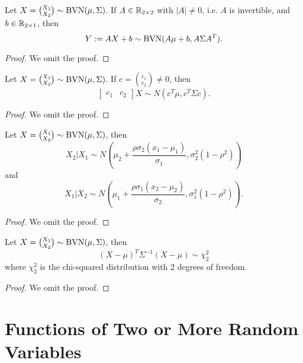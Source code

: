 \documentclass[11pt,fleqn]{book} %
\begin{document}
\begin{corollary} Let \(X = \binom{X_1}{X_2} \sim \operatorname{BVN}(\mu, \Sigma)\). If \(A \in \mathbb{R}_{2\times2}\) with \(|A| \neq 0\), i.e. \(A\) is invertible, and \(b \in \mathbb{R}_{2\times1}\), then
\[
Y:= AX + b \sim \operatorname{BVN}(A\mu + b, A\Sigma A^T).
\]
\end{corollary}
\begin{proof} We omit the proof.\end{proof}

\begin{corollary} Let \(X = \binom{X_1}{X_2} \sim \operatorname{BVN}(\mu, \Sigma)\). If \(c = \binom{c_1}{c_2} \neq 0\), then
\[
\begin{bmatrix}c_1 & c_2\end{bmatrix}X \sim N(c^T \mu, c^T\Sigma c).
\]
\end{corollary}
\begin{proof} We omit the proof.\end{proof}

\begin{proposition} Let \(X = \binom{X_1}{X_2} \sim \operatorname{BVN}(\mu, \Sigma)\), then
\[
X_2 | X_1 \sim N\left(\mu_2 + \frac{\rho\sigma_2(x_1 - \mu_1)}{\sigma_1}, \sigma_2^2(1 - \rho^2)\right)
\]
and
\[
X_1 | X_2 \sim N\left(\mu_1 + \frac{\rho\sigma_1(x_2 - \mu_2)}{\sigma_2}, \sigma_1^2(1 - \rho^2)\right).
\]
\end{proposition}
\begin{proof} We omit the proof.\end{proof}

\begin{proposition} Let \(X = \binom{X_1}{X_2} \sim \operatorname{BVN}(\mu, \Sigma)\), then
\[
(X - \mu)^T\Sigma^{-1}(X - \mu) \sim \chi_2^2
\]
where \(\chi_2^2\) is the chi-squared distribution with 2 degrees of freedom.
\end{proposition}
\begin{proof} We omit the proof.\end{proof}




\chapter{Functions of Two or More Random Variables}
\end{document}
